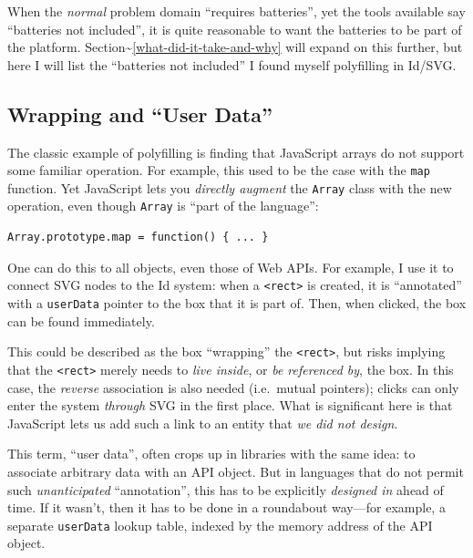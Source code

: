 When the \emph{normal} problem domain ``requires batteries'', yet the
tools available say ``batteries not included'', it is quite reasonable
to want the batteries to be part of the platform.
Section\textasciitilde{}\ref{what-did-it-take-and-why} will expand on
this further, but here I will list the ``batteries not included'' I
found myself polyfilling in Id{}/SVG.

\hypertarget{wrapping-and-user-data}{%
\subsection{Wrapping and ``User Data''}\label{wrapping-and-user-data}}

The classic example of polyfilling is finding that JavaScript arrays do
not support some familiar operation. For example, this used to be the
case with the \texttt{map} function. Yet JavaScript lets you
\emph{directly augment} the \texttt{Array} class with the new operation,
even though \texttt{Array} is ``part of the language'':

\begin{lstlisting}
Array.prototype.map = function() { ... }
\end{lstlisting}

One can do this to all objects, even those of Web APIs. For example, I
use it to connect SVG nodes to the Id{} system: when a
\texttt{\textless{}rect\textgreater{}} is created, it is ``annotated''
with a \texttt{userData} pointer to the box that it is part of. Then,
when clicked, the box can be found immediately.

This could be described as the box ``wrapping'' the
\texttt{\textless{}rect\textgreater{}}, but risks implying that the
\texttt{\textless{}rect\textgreater{}} merely needs to \emph{live
inside}, or \emph{be referenced by}, the box. In this case, the
\emph{reverse} association is also needed (i.e.~mutual pointers); clicks
can only enter the system \emph{through} SVG in the first place. What is
significant here is that JavaScript lets us add such a link to an entity
that \emph{we did not design}.

This term, ``user data'', often crops up in libraries with the same
idea: to associate arbitrary data with an API object. But in languages
that do not permit such \emph{unanticipated} ``annotation'', this has to
be explicitly \emph{designed in} ahead of time. If it wasn't, then it
has to be done in a roundabout way---for example, a separate
\texttt{userData} lookup table, indexed by the memory address of the API
object.

